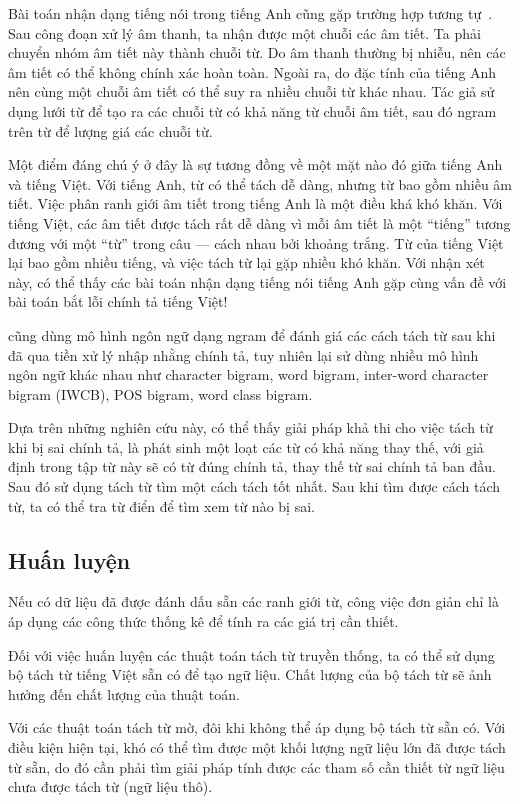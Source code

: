 \documentclass[a4paper,oneside,14pt]{extbook} %
\begin{document}
Bài toán nhận dạng tiếng nói trong tiếng Anh cũng gặp trường hợp tương
tự~\cite{Ravishankar}. Sau công đoạn xử lý âm thanh, ta nhận được 
một chuỗi các âm tiết. Ta phải chuyển nhóm âm tiết này thành
chuỗi từ. Do âm thanh thường bị nhiễu, nên các âm tiết có thể
không chính xác hoàn toàn. Ngoài ra, do đặc tính của tiếng Anh nên
cùng một chuỗi âm tiết có thể suy ra nhiều chuỗi từ khác nhau. Tác giả
sử dụng lưới từ để tạo ra các chuỗi từ có khả năng từ chuỗi âm tiết,
sau đó ngram trên từ để lượng giá các chuỗi từ.

Một điểm đáng chú ý ở
đây là sự tương đồng về một mặt nào đó giữa tiếng Anh và tiếng
Việt. Với tiếng Anh, từ có thể tách dễ dàng, nhưng từ bao gồm nhiều âm
tiết. Việc phân ranh giới âm tiết trong tiếng Anh là một điều khá khó
khăn. Với tiếng Việt, các âm tiết được tách rất dễ dàng vì mỗi âm tiết
là một ``tiếng'' tương đương với một ``từ'' trong câu --- cách nhau
bởi khoảng trắng. Từ của tiếng Việt lại bao gồm nhiều tiếng, và việc
tách từ lại gặp nhiều khó khăn. Với nhận xét này, có thể thấy các bài
toán nhận dạng tiếng nói tiếng Anh gặp cùng vấn đề với bài toán bắt
lỗi chính tả tiếng Việt!

\cite{Chang} cũng dùng mô hình ngôn ngữ dạng ngram để đánh giá các
cách tách từ sau khi đã qua tiền xử lý nhập nhằng chính tả, tuy nhiên
lại sử dùng nhiều mô hình ngôn ngữ khác nhau như 
character bigram, word bigram, inter-word character bigram (IWCB), POS
bigram, word class bigram.

Dựa trên những nghiên cứu này, có thể thấy giải pháp khả thi cho việc
tách từ khi bị 
sai chính tả, là phát sinh một loạt các từ có khả năng thay thế, với
giả định trong tập từ này sẽ có từ đúng chính tả, thay thế từ sai chính
tả ban đầu. Sau đó sử dụng tách từ tìm một cách tách tốt nhất. Sau khi
tìm được cách tách từ, ta có thể tra từ điển để tìm xem từ nào bị sai.

\subsection{Huấn luyện}

Nếu có dữ liệu đã được đánh dấu sẵn các ranh giới từ, công việc đơn
giản chỉ là áp dụng các công thức thống kê để tính ra các giá trị cần
thiết.

Đối với việc huấn luyện các thuật toán tách từ truyền thống, ta có thể
sử dụng bộ tách từ tiếng Việt sẵn có để tạo ngữ liệu. Chất lượng của
bộ tách từ sẽ ảnh hưởng đến chất lượng của thuật toán.

Với các thuật toán tách từ mờ, đôi khi không thể áp dụng bộ tách từ
sẵn có. Với điều kiện hiện tại, khó có thể tìm được một khối lượng
ngữ liệu lớn đã được tách từ sẵn, do đó cần phải tìm giải pháp tính
được các tham số cần thiết từ ngữ liệu chưa được tách từ (ngữ liệu thô).
\end{document}
